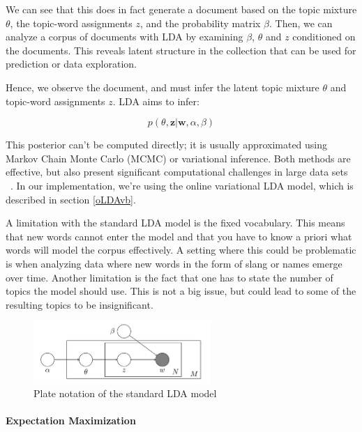 \documentclass[12pt]{report}
\begin{document}
We can see that this does in fact generate a document based on the topic 
mixture $\theta$, the topic-word assignments $z$, and the probability 
matrix $\beta$. Then, we can analyze a corpus of documents with LDA by 
examining $\beta$, $\theta$ 
and $z$ conditioned on the documents. This reveals latent structure in
the collection that can be used for prediction or data exploration. 

Hence, we observe the document, and must infer the latent topic mixture 
$\theta$ and topic-word assignments $z$. LDA aims to infer:

\begin{equation}
p(\theta, \textbf{z} |\textbf{w}, \alpha, \beta)
\end{equation}

This
posterior can't be computed directly; it is usually approximated using Markov
Chain Monte Carlo (MCMC) or variational inference. Both methods are effective,
but also present significant computational challenges in large data sets
~\cite{onlineLDAvb}. In our implementation, we're using the online variational
LDA model, which is described in section \ref{oLDAvb}.
 
A limitation with the standard LDA model is the fixed 
vocabulary. This means that new words cannot enter the model and that
you have to know a priori what words will model the corpus
effectively. A setting where this could be problematic is when
analyzing data where new words in the form of slang or names emerge
over time. Another limitation is the fact that one has to state the
number of topics the model should use. This is not a big issue, but
could lead to some of the resulting topics to be insignificant.
\begin{center}
\begin{figure}[h]
\centering
\includegraphics[width=0.6\textwidth]{figs/LDA_standard_model.png}
\caption{Plate notation of the standard LDA model}
\label{figLDA}
\end{figure}
\end{center}

\paragraph{Expectation Maximization}
\end{document}
